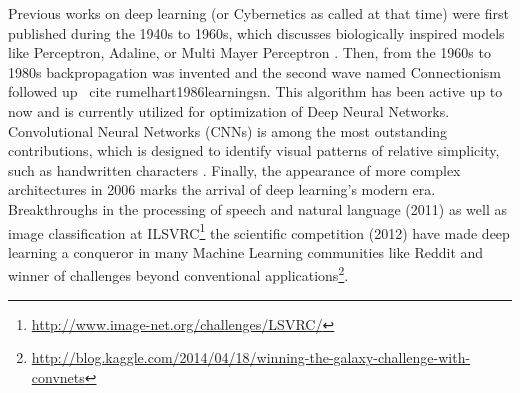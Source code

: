     Previous works on deep learning (or Cybernetics as called at that time) were first published during the 1940s to 1960s, which discusses biologically inspired models like Perceptron, Adaline, or Multi Mayer Perceptron \cite{rosenblatt2000probabilistic, schmidhuber2015deep}. Then, from the 1960s to 1980s backpropagation was invented and the second wave named Connectionism followed up \ cite {rumelhart1986learning}sn. This algorithm has been active up to now and is currently utilized for optimization of Deep Neural Networks. Convolutional Neural Networks (CNNs) is among the most outstanding contributions, which is designed to identify visual patterns of relative simplicity, such as handwritten characters \cite{lecun1995convolutional}. Finally, the appearance of more complex architectures in 2006 marks the arrival of deep learning’s modern era\cite{hinton2006fast,bengio2007greedy,huang2007unsupervised}. Breakthroughs in the processing of speech and natural language (2011) as well as image classification at ILSVRC\footnote{\url{http://www.image-net.org/challenges/LSVRC/}} the scientific competition (2012) have made deep learning a conqueror in many Machine Learning communities like Reddit and winner of challenges beyond conventional applications\footnote{\url{http://blog.kaggle.com/2014/04/18/winning-the-galaxy-challenge-with-convnets}}. 



